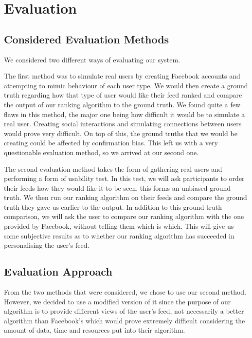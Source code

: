 \chapter{Evaluation}\label{ch:eval}


\section {Considered Evaluation Methods}

We considered two different ways of evaluating our system.

The first method was to simulate real users by creating Facebook accounts and attempting to mimic behaviour of each user type. We would then create a ground truth regarding how that type of user would like their feed ranked and compare the output of our ranking algorithm to the ground truth. We found quite a few flaws in this method, the major one being how difficult it would be to simulate a real user. Creating social interactions and simulating connections between users would prove very difficult. On top of this, the ground truths that we would be creating could be affected by confirmation bias. This left us with a very questionable evaluation method, so we arrived at our second one.

The second evaluation method takes the form of gathering real users and performing a form of usability test. In this test, we will ask participants to order their feeds how they would like it to be seen, this forms an unbiased ground truth. We then run our ranking algorithm on their feeds and compare the ground truth they gave us earlier to the output. In addition to this ground truth comparison, we will ask the user to compare our ranking algorithm with the one provided by Facebook, without telling them which is which. This will give us some subjective results as to whether our ranking algorithm has succeeded in personalising the user's feed.

\section{Evaluation Approach}

From the two methods that were considered, we chose to use our second method. However, we decided to use a modified version of it since the purpose of our algorithm is to provide different views of the user’s feed, not necessarily a better algorithm than Facebook’s which would prove extremely difficult considering the amount of data, time and resources put into their algorithm. 

